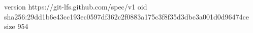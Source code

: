 version https://git-lfs.github.com/spec/v1
oid sha256:29dd1b6e43cc193ec0597df362c2f0883a175c3f8f35d3dbc3a001d0d96474ce
size 954

